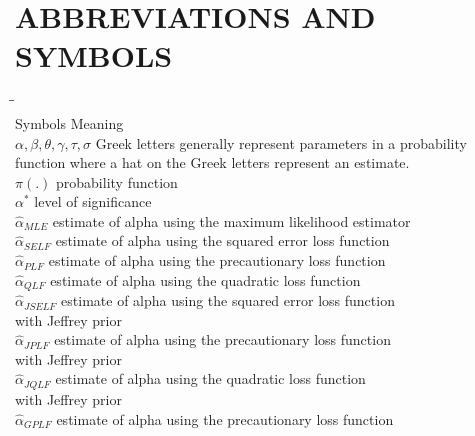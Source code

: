 \documentclass[a4paper,12pt]{report}
\begin{document}
\newpage


{\tableofcontents}

\clearpage

\newpage
{}\listoftables 

\newpage
{}\listoffigures 

\newpage
{}
\chapter*{ABBREVIATIONS AND SYMBOLS}

\begin{tabbing}\hspace{0.5cm}\=\hspace{4cm}\=\kill\\
	\> Symbols \> Meaning \\ 
	\>$\alpha,\beta,\theta,\gamma,\tau,\sigma$ \> Greek letters generally represent parameters in a probability \\
	\> \> function where a hat on the Greek letters represent an estimate. \\
	\>$\pi(.)$ \> probability function\\	
	\>$\alpha^*$ \> level of significance\\
	\>$\hat{\alpha}_{MLE}$ \> estimate of alpha using the maximum likelihood estimator\\
	\>$\hat{\alpha}_{SELF}$ \>  estimate of alpha using the squared error loss function\\
	\>$\hat{\alpha}_{PLF}$ \> estimate of alpha using the precautionary loss function\\
	\>$\hat{\alpha}_{QLF}$ \> estimate of alpha using the quadratic loss function\\
	\>$\hat{\alpha}_{JSELF}$ \> estimate of alpha using the squared error loss function \\
	\>\>with Jeffrey prior\\
	\>$\hat{\alpha}_{JPLF}$ \> estimate of alpha using the precautionary loss function\\ 
	\> \> with Jeffrey prior\\
	\>$\hat{\alpha}_{JQLF}$ \> estimate of alpha using the quadratic loss function\\ 
	\>\> with Jeffrey prior\\
	\> $\hat{\alpha}_{GPLF}$\> estimate of alpha using the precautionary loss function\\

\end{tabbing}
\end{document}
